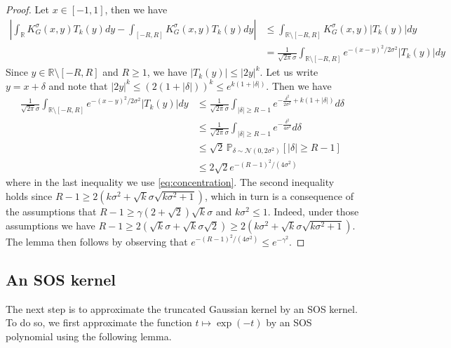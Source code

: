 \documentclass[11pt]{article}
\newcommand{\R}{\mathbb{R}}
\theoremstyle{definition}
\begin{document}
\begin{proof} %

Let $x \in [-1,1]$, then we have %
\begin{align*}
\left|\int_{\R} K^\sigma_G(x,y)T_k(y)dy-\int_{[-R,R]} K^\sigma_G(x,y)T_k(y)dy\right| &\leq \int_{\R \setminus [-R,R]} K^\sigma_G(x,y)|T_k(y)| dy \\
&= \frac{1}{\sqrt{2\pi}\sigma} \int_{\R \setminus [-R,R]} e^{-(x-y)^2/2\sigma^2} |T_k(y)| dy
\end{align*}
Since $y \in \R \setminus [-R,R]$ and $R \geq 1$, we have $|T_k(y)| \leq |2y|^k$. Let us write $y = x+\delta$ and note that $|2y|^k \leq (2(1+|\delta|))^k \leq e^{k(1+|\delta|)}$. Then we have
\begin{align*}
    \frac{1}{\sqrt{2\pi}\sigma} \int_{\R \setminus [-R,R]} e^{-(x-y)^2/2\sigma^2} |T_k(y)| dy  &\leq \frac{1}{\sqrt{2\pi}\sigma} \int_{|\delta| \geq R-1} e^{-\frac{\delta^2}{2\sigma^2} +k(1+|\delta|)}  d\delta \\
    &\leq \frac{1}{\sqrt{2\pi}\sigma} \int_{|\delta| \geq R-1} e^{-\frac{\delta^2}{4\sigma^2}}  d\delta \\
    &\leq \sqrt{2}\, \mathbb{P}_{\delta \sim \mathcal N(0,2\sigma^2)}[|\delta| \geq R-1] \\
    &\leq 2\sqrt{2} e^{-(R-1)^2/(4\sigma^2)}
\end{align*}
where in the last inequality we use \cref{eq:concentration}. The second inequality holds since $R-1 \geq  2(k\sigma^2 + \sqrt{k}\sigma\sqrt{k\sigma^2 + 1})$, which in turn is a consequence of the assumptions that $R-1 \geq \gamma(2+\sqrt{2})\sqrt{k}\sigma$ and $k \sigma^2 \leq 1$. Indeed, under those assumptions we have $R-1 \geq  2(\sqrt{k}\sigma+\sqrt{k}\sigma \sqrt{2}) \geq 2(k\sigma^2 + \sqrt{k}\sigma\sqrt{k\sigma^2 + 1})$. The lemma then follows by observing that $e^{-(R-1)^2/(4\sigma^2)} \leq e^{-\gamma^2}$.
\end{proof}

\subsection{An SOS kernel}
\label{sec:SOS kernel}

The next step is to approximate the truncated Gaussian kernel by an SOS kernel.
To do so, we first approximate the function $t \mapsto \exp(-t)$ by an SOS polynomial using the following lemma.
\end{document}

